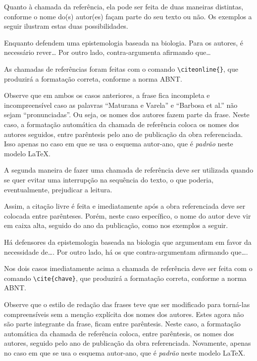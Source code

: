 \begin{apendicesenv}
    Quanto à chamada da referência, ela pode ser feita de duas maneiras distintas, conforme o nome do(s) autor(es) façam parte do seu texto ou não.
    Os exemplos a seguir ilustram estas duas possibilidades.

    Enquanto  defendem uma epistemologia baseada na biologia.
    Para os autores, é necessário rever\ldots
    Por outro lado,  contra-argumenta afirmando que\ldots

    As chamadas de referências foram feitas com o comando \verb|\citeonline{}|, que produzirá a formatação correta, conforme a norma ABNT.

    Observe que em ambos os casos anteriores, a frase fica incompleta e incompreensível caso as palavras ``Maturana e Varela'' e ``Barbosa et al.'' não sejam ``pronunciadas''.
    Ou seja, os nomes dos autores fazem parte da frase.
    Neste caso, a formatação automática da chamada de referência coloca os nomes dos autores seguidos, entre parêntesis pelo ano de publicação da obra referenciada.
    Isso apenas no caso em que se usa o esquema autor-ano, que é \textit{padrão} neste modelo \LaTeX{}.

    A segunda maneira de fazer uma chamada de referência deve ser utilizada quando se quer evitar uma interrupção na sequência do texto, o que poderia, eventualmente, prejudicar a leitura.

    \newpage

    Assim, a citação livre é feita e imediatamente após a obra referenciada deve ser colocada entre parênteses.
    Porém, neste caso específico, o nome do autor deve vir em caixa alta, seguido do ano da publicação, como nos exemplos a seguir.

    Há defensores da epistemologia baseada na biologia que argumentam em favor da necessidade de\ldots \cite{Maturana2003}.
    Por outro lado, há os que contra-argumentam afirmando que\ldots  \cite{nunes2017local}.

    Nos dois casos imediatamente acima a chamada de referência deve ser feita com o comando \verb|\cite{chave}|, que produzirá a formatação correta, conforme a norma ABNT.

    Observe que o estilo de redação das frases teve que ser modificado para torná-las compreensíveis sem a menção explícita dos nomes dos autores.
    Estes agora não são parte integrante da frase, ficam entre parêntesis.
    Neste caso, a formatação automática da chamada de referência coloca, entre parêntesis, os nomes dos autores, seguido pelo ano de publicação da obra referenciada.
    Novamente, apenas no caso em que se usa o esquema autor-ano, que é \textit{padrão} neste modelo \LaTeX{}.


\end{apendicesenv}
